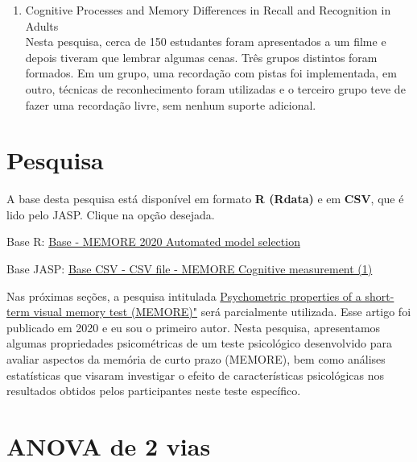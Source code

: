 \documentclass[
]{book}
\providecommand{\tightlist}{%
  \setlength{\itemsep}{0pt}\setlength{\parskip}{0pt}}
\newenvironment{base}{
  \definecolor{shadecolor}{rgb}{0.764,0.992,0.686}  %
  \color{black}
  \begin{shaded}}
 {\end{shaded}}
\begin{document}
\begin{enumerate}
\def\labelenumi{\arabic{enumi}.}
\tightlist
\item
  Cognitive Processes and Memory Differences in Recall and Recognition in Adults\\
  Nesta pesquisa, cerca de 150 estudantes foram apresentados a um filme e depois tiveram que lembrar algumas cenas. Três grupos distintos foram formados. Em um grupo, uma recordação com pistas foi implementada, em outro, técnicas de reconhecimento foram utilizadas e o terceiro grupo teve de fazer uma recordação livre, sem nenhum suporte adicional.
\end{enumerate}

\hypertarget{pesquisa-5}{%
\section{Pesquisa}\label{pesquisa-5}}

\begin{base}
A base desta pesquisa está disponível em formato \textbf{R (Rdata)} e em \textbf{CSV}, que é lido pelo JASP. Clique na opção desejada.

Base R: \href{https://github.com/anovabr/mqt/raw/master/bases/Base\%20-\%20MEMORE\%202020\%20Automated\%20model\%20selection.RData}{Base - MEMORE 2020 Automated model selection}

Base JASP: \href{https://github.com/anovabr/mqt/raw/master/bases/bases_csv_jasp.zip}{Base CSV - CSV file - MEMORE Cognitive measurement (1)}

\end{base}

Nas próximas seções, a pesquisa intitulada \href{https://www.neuropsicolatina.org/index.php/Neuropsicologia_Latinoamericana/article/view/545}{Psychometric properties of a short-term visual memory test (MEMORE)"} será parcialmente utilizada. Esse artigo foi publicado em 2020 e eu sou o primeiro autor. Nesta pesquisa, apresentamos algumas propriedades psicométricas de um teste psicológico desenvolvido para avaliar aspectos da memória de curto prazo (MEMORE), bem como análises estatísticas que visaram investigar o efeito de características psicológicas nos resultados obtidos pelos participantes neste teste específico.

\hypertarget{anova-de-2-vias}{%
\section{ANOVA de 2 vias}\label{anova-de-2-vias}}
\end{document}
